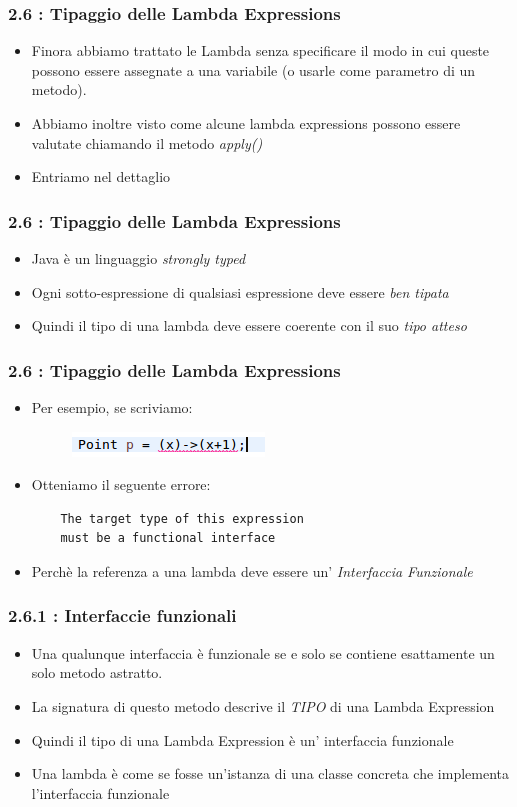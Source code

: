\documentclass{beamer}
\begin{document}
\begin{frame}
\frametitle{\textbf{2.6 : Tipaggio delle Lambda Expressions}}
\begin{itemize}
	\item Finora abbiamo trattato le Lambda senza specificare il modo in cui queste possono essere assegnate a una variabile (o usarle come parametro di un metodo).
	\item Abbiamo inoltre visto come alcune lambda expressions possono essere valutate chiamando il metodo \emph{apply()}
	\item Entriamo nel dettaglio
\end{itemize}
\end{frame}

\begin{frame}
\frametitle{\textbf{2.6 : Tipaggio delle Lambda Expressions}}
\begin{itemize}
	\item Java \`e un linguaggio \emph{strongly typed}
	\item Ogni sotto-espressione di qualsiasi espressione deve essere \emph{ben tipata}
	\item Quindi il tipo di una lambda deve essere coerente con il suo \emph{tipo atteso}
\end{itemize}
\end{frame}

\begin{frame}[fragile]
\frametitle{\textbf{2.6 : Tipaggio delle Lambda Expressions}}
\begin{itemize}
	\item Per esempio, se scriviamo:
	\begin{figure}
		\centering
		\includegraphics[width=0.3\linewidth]{target}
		\label{fig:target}
	\end{figure}
	\item Otteniamo il seguente errore:
	\begin{lstlisting}
	The target type of this expression
	must be a functional interface
	\end{lstlisting}
	\item Perchè la referenza a una lambda deve essere un' \emph{Interfaccia Funzionale}
\end{itemize}
\end{frame}

\begin{frame}
\frametitle{\textbf{2.6.1 : Interfaccie funzionali}}
\begin{itemize}
	\item Una qualunque interfaccia è funzionale se e solo se contiene esattamente un solo metodo astratto.
	\item La signatura di questo metodo descrive il \emph{TIPO} di una Lambda Expression
	\item Quindi il tipo di una Lambda Expression \`e un' interfaccia funzionale
	\item Una lambda è come se fosse un'istanza di una classe concreta che implementa l'interfaccia funzionale
\end{itemize}
\end{frame}
\end{document}
